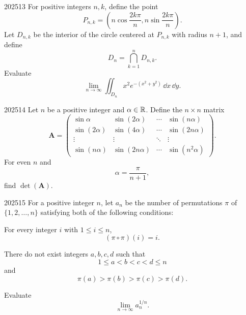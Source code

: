 \begin{problem}{2025}{1}{3}
For positive integers $n, k$, define the point
\[
    P_{n, k}
    =
    \left(
        n\cos\frac{2k\pi}{n},
        n\sin\frac{2k\pi}{n}
    \right).
\]
Let $D_{n, k}$ be the interior of the circle centered at $P_{n, k}$ with radius $n+1$, and define
\[
    D_n=\bigcap_{k=1}^n D_{n, k}.
\]
Evaluate
\[
    \lim_{n\to\infty}
    \iint_{D_n}
    x^2e^{-(x^2+y^2)}\, \dd x\, \dd y.
\]
\end{problem}

\begin{problem}{2025}{1}{4}
Let $n$ be a positive integer and $\alpha\in\mathbb{R}$. Define the $n\times n$ matrix
\[
    \mathbf A=
    \begin{pmatrix}
        \sin\alpha & \sin(2\alpha) & \cdots & \sin(n\alpha)\\
        \sin(2\alpha) & \sin(4\alpha) & \cdots & \sin(2n\alpha)\\
        \vdots & \vdots & \ddots & \vdots\\
        \sin(n\alpha) & \sin(2n\alpha) & \cdots & \sin(n^2\alpha)
    \end{pmatrix}.
\]
For even $n$ and
\[
    \alpha=\frac\pi{n+1},
\]
find $\det(\mathbf A)$.
\end{problem}

\begin{problem}{2025}{1}{5}
For a positive integer $n$, let $a_n$ be the number of permutations $\pi$ of $\{1, 2, \dots, n\}$ satisfying both of the following conditions:
\begin{problemclauses}
    \item For every integer $i$ with $1\le i\le n$,
    \[
        (\pi\circ\pi)(i)=i.
    \]
    \item There do not exist integers $a, b, c, d$ such that
    \[
        1\le a<b<c<d\le n
    \]
    and
    \[
        \pi(a)>\pi(b)>\pi(c)>\pi(d).
    \]
\end{problemclauses}
Evaluate
\[
    \lim_{n\to\infty}a_n^{1/n}.
\]
\end{problem}
